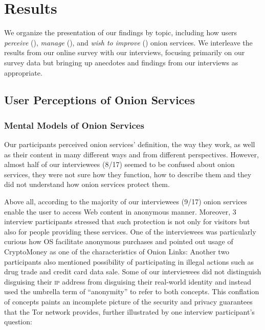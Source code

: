 \section{Results}
\label{sec:results}
We organize the presentation of our findings by topic, including how users
\emph{perceive} (), \emph{manage} (),
and \emph{wish to improve} () onion services.  We interleave the
results from our online survey with our interviews, focusing primarily on our
survey data but bringing up anecdotes and findings from our interviews as
appropriate.

\subsection{User Perceptions of Onion Services}
\label{sec:perception}

\subsubsection{Mental Models of Onion Services}


Our participants perceived onion services’ definition, the way they work, as well as their content in many different ways and from different perspectives. However, almost half of our interviewees (8/17) seemed to be confused about onion services, they were not sure how they function, how to describe them and they did not understand how onion services protect them. 

Above all, according to the majority of our interviewees (9/17) onion services enable the user to access Web content in anonymous manner. Moreover, 3 interview participants stressed that such protection is not only for visitors but also for people providing these services. One of the interviewees was particularly curious how OS facilitate anonymous purchases and pointed out usage of CryptoMoney as one of the characteristics of Onion Links:  Another two participants also mentioned possibility of participating in illegal actions such as drug trade and credit card data sale. Some of our interviewees did not distinguish disguising their \textsc{ip}  address from disguising their real-world identity and instead used the umbrella term of “anonymity” to refer
to both concepts. This conflation of concepts paints
an incomplete picture of the security and privacy guarantees
that the Tor network provides, further illustrated
by one interview participant’s question: 

